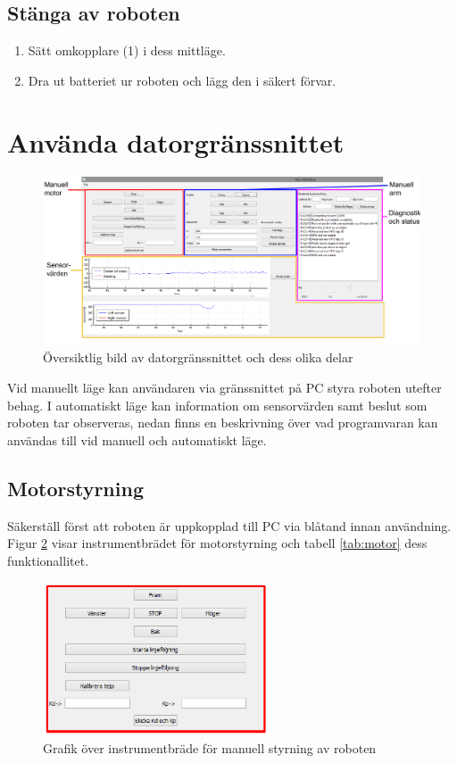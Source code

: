 \documentclass[a4paper,12pt]{article}
\begin{document}
\subsection{Stänga av roboten}
\begin{enumerate}
\item Sätt omkopplare (1) i dess mittläge.
\item Dra ut batteriet ur roboten och lägg den i säkert förvar.
\end{enumerate}
%
%
\section{Använda datorgränssnittet}

\begin{figure}[H]
	\centering
	\includegraphics[width=1.0\textwidth]{PC_manual.pdf}
	\caption{Översiktlig bild av datorgränssnittet och dess olika delar}
	\label{fig:pc_oversikt}
\end{figure}

Vid manuellt läge kan användaren via gränssnittet på PC styra roboten utefter behag. I automatiskt läge kan information om sensorvärden samt beslut som roboten tar observeras, nedan finns en beskrivning över vad programvaran kan användas till vid manuell och automatiskt läge. 

\subsection{Motorstyrning}
\label{subsec:motor}
Säkerställ först att roboten är uppkopplad till PC via blåtand innan användning. Figur \ref{fig:pc_motor} visar instrumentbrädet för motorstyrning och tabell \ref{tab:motor} dess funktionallitet.

\begin{figure}[H]
	\centering
	\includegraphics[width=0.6\textwidth]{man_motor1.pdf}
	\caption{Grafik över instrumentbräde för manuell styrning av roboten}
	\label{fig:pc_motor}
\end{figure}
\end{document}
